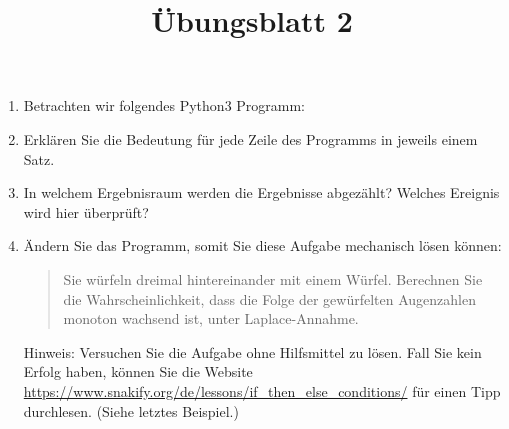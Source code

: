 \documentclass{article}
\begin{document}
\title{Übungsblatt 2}
\date{}
\maketitle
{}
\makeatletter
\def\lst@outputspace{{\ifx\lst@bkgcolor\empty\color{white}\else\lst@bkgcolor\fi\lst@visiblespace}}
\makeatother
\thispagestyle{empty}
\begin{enumerate}
\item Betrachten wir folgendes Python3 Programm:


\item Erklären Sie die Bedeutung für jede Zeile des Programms in jeweils einem Satz.

\item In welchem Ergebnisraum werden die Ergebnisse abgezählt? Welches Ereignis wird hier
überprüft?

\item Ändern Sie das Programm, somit Sie diese Aufgabe mechanisch lösen können:

\begin{quote}
Sie würfeln dreimal hintereinander mit einem Würfel. Berechnen Sie die Wahrscheinlichkeit,
dass die Folge der gewürfelten Augenzahlen monoton wachsend ist, unter Laplace-Annahme.
\end{quote}

Hinweis: Versuchen Sie die Aufgabe ohne Hilfsmittel zu lösen. Fall Sie kein Erfolg haben,
können Sie die Website \url{https://www.snakify.org/de/lessons/if_then_else_conditions/}
für einen Tipp durchlesen. (Siehe letztes Beispiel.)

\end{enumerate}
\end{document}
